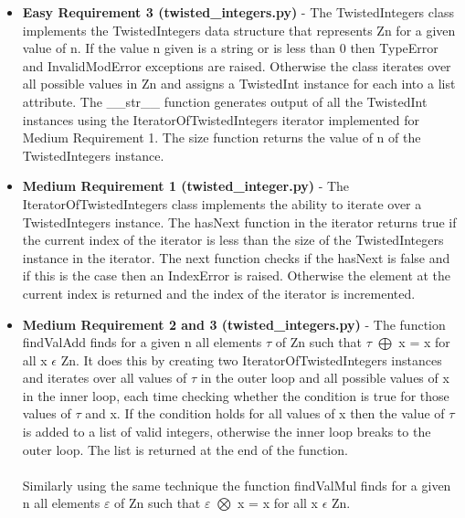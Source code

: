\documentclass[11]{article}
\begin{document}
\begin{itemize}
			\item \textbf{Easy Requirement 3 (twisted\_integers.py)} - The TwistedIntegers class implements the TwistedIntegers data structure that represents Zn for a given value of n. If the value n given is a string or is less than 0 then TypeError and InvalidModError exceptions are raised. Otherwise the class iterates over all possible values in Zn and assigns a TwistedInt instance for each into a list attribute. The \_\_str\_\_ function generates output of all the TwistedInt instances using the IteratorOfTwistedIntegers iterator implemented for Medium Requirement 1. The size function returns the value of n of the TwistedIntegers instance.
			
		\item \textbf{Medium Requirement 1 (twisted\_integer.py)} - The IteratorOfTwistedIntegers class implements the ability to iterate over a TwistedIntegers instance. The hasNext function in the iterator returns true if the current index of the iterator is less than the size of the TwistedIntegers instance in the iterator. The next function checks if the hasNext is false and if this is the case then an IndexError is raised. Otherwise the element at the current index is returned and the index of the iterator is incremented.
		
		\item \textbf{Medium Requirement 2 and 3 (twisted\_integers.py)} - The function findValAdd finds for a given n all elements $\tau$ of Zn such that $\tau$ $\bigoplus$ x = x for all x $\epsilon$ Zn. It does this by creating two IteratorOfTwistedIntegers instances and iterates over all values of $\tau$ in the outer loop and all possible values of x in the inner loop, each time checking whether the condition is true for those values of $\tau$ and x. If the condition holds for all values of x then the value of $\tau$ is added to a list of valid integers, otherwise the inner loop breaks to the outer loop. The list is returned at the end of the function. \\\\ Similarly using the same technique the function findValMul finds for a given n all elements $\varepsilon$ of Zn such that $\varepsilon$ $\bigotimes$ x = x for all x $\epsilon$ Zn.
		

\end{itemize}
\end{document}

